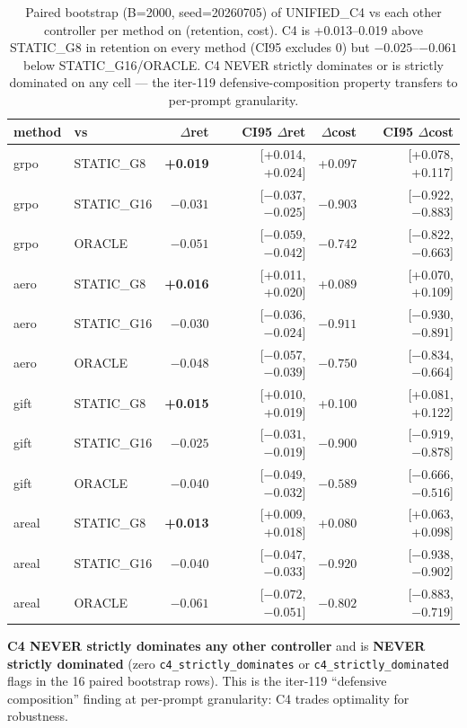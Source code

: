 \begin{table}[ht]
\centering
\small
\begin{tabular}{llrrrr}
\toprule
method & vs & $\Delta$ret & CI95 $\Delta$ret & $\Delta$cost & CI95 $\Delta$cost \\
\midrule
grpo  & STATIC\_G8 & \textbf{+0.019} & [+0.014, +0.024] & +0.097 & [+0.078, +0.117] \\
grpo  & STATIC\_G16 & $-0.031$ & [$-0.037$, $-0.025$] & $-0.903$ & [$-0.922$, $-0.883$] \\
grpo  & ORACLE & $-0.051$ & [$-0.059$, $-0.042$] & $-0.742$ & [$-0.822$, $-0.663$] \\
aero  & STATIC\_G8 & \textbf{+0.016} & [+0.011, +0.020] & +0.089 & [+0.070, +0.109] \\
aero  & STATIC\_G16 & $-0.030$ & [$-0.036$, $-0.024$] & $-0.911$ & [$-0.930$, $-0.891$] \\
aero  & ORACLE & $-0.048$ & [$-0.057$, $-0.039$] & $-0.750$ & [$-0.834$, $-0.664$] \\
gift  & STATIC\_G8 & \textbf{+0.015} & [+0.010, +0.019] & +0.100 & [+0.081, +0.122] \\
gift  & STATIC\_G16 & $-0.025$ & [$-0.031$, $-0.019$] & $-0.900$ & [$-0.919$, $-0.878$] \\
gift  & ORACLE & $-0.040$ & [$-0.049$, $-0.032$] & $-0.589$ & [$-0.666$, $-0.516$] \\
areal & STATIC\_G8 & \textbf{+0.013} & [+0.009, +0.018] & +0.080 & [+0.063, +0.098] \\
areal & STATIC\_G16 & $-0.040$ & [$-0.047$, $-0.033$] & $-0.920$ & [$-0.938$, $-0.902$] \\
areal & ORACLE & $-0.061$ & [$-0.072$, $-0.051$] & $-0.802$ & [$-0.883$, $-0.719$] \\
\bottomrule
\end{tabular}
\caption{Paired bootstrap (B=2000, seed=20260705) of UNIFIED\_C4 vs each
other controller per method on (retention, cost). C4 is +0.013--0.019 above
STATIC\_G8 in retention on every method (CI95 excludes 0) but $-0.025$--$-0.061$
below STATIC\_G16/ORACLE. C4 NEVER strictly dominates or is strictly dominated
on any cell --- the iter-119 defensive-composition property transfers to
per-prompt granularity.}
\label{tab:p7-iter159-paired-c4}
\end{table}

\textbf{C4 NEVER strictly dominates any other controller} and is
\textbf{NEVER strictly dominated} (zero \texttt{c4\_strictly\_dominates} or
\texttt{c4\_strictly\_dominated} flags in the 16 paired bootstrap rows).
This is the iter-119 ``defensive composition'' finding at per-prompt
granularity: C4 trades optimality for robustness.

